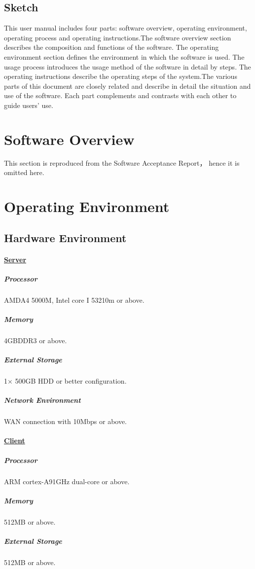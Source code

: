 \documentclass[10pt]{article}
\begin{document}
\subsection{Sketch}
This user manual includes four parts: software overview, operating environment, operating process and operating instructions.The software overview section describes the composition and functions of the software. The operating environment section defines the environment in which the software is used. The usage process introduces the usage method of the software in detail by steps. The operating instructions describe the operating steps of the system.The various parts of this document are closely related and describe in detail the situation and use of the software. Each part complements and contrasts with each other to guide users' use.

\section{Software Overview}
This section is reproduced from the Software Acceptance Report， hence it is omitted here.

\section{Operating Environment}
\subsection{Hardware Environment}
\paragraph{\underline{Server}}
\subparagraph{Processor}
AMDA4 5000M, Intel core I 53210m or above.

\subparagraph{Memory}
4GBDDR3 or above.

\subparagraph{External Storage}
1× 500GB HDD or better configuration.

\subparagraph{Network Environment}
WAN connection with 10Mbps or above.

\paragraph{\underline{Client}}
\subparagraph{Processor}
ARM cortex-A91GHz dual-core or above.

\subparagraph{Memory}
512MB or above.

\subparagraph{External Storage}
512MB or above.
\end{document}
